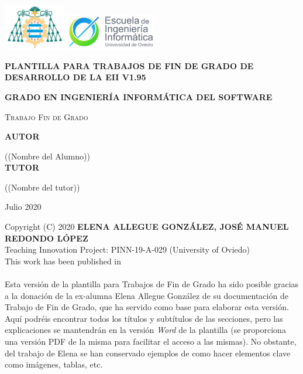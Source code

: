 \documentclass[11pt]{report}
\begin{document}

\hypersetup{pageanchor=false}
\begin{titlepage}
	\centering
	\includegraphics[width=0.2\textwidth]{EscudoUniovi}
	\hspace{3 cm}
	\includegraphics[width=0.3\textwidth]{EscudoEscuela}
	\par\vspace{1cm}
	
	\vspace{1.5cm}
	{\huge\bfseries PLANTILLA PARA TRABAJOS DE FIN DE GRADO DE DESARROLLO DE LA EII V1.95\par}
	\vspace{2cm}
	{\large \textbf{GRADO EN INGENIERÍA INFORMÁTICA DEL SOFTWARE} \par}
	\vspace{1cm}
	{\scshape\Large Trabajo Fin de Grado\par}
   	
  \vspace{2cm}
	\textbf{AUTOR}\par
	((Nombre del Alumno)) \\
	\vspace{1.5cm}
	\textbf{TUTOR}\par
	((Nombre del tutor))
	\vfill
	
	{\large Julio 2020 \par}
\end{titlepage}


\newpage
Copyright (C) 2020 \textbf{ELENA ALLEGUE GONZÁLEZ, JOSÉ MANUEL REDONDO LÓPEZ} \\
Teaching Innovation Project: PINN-19-A-029 (University of Oviedo)\\
This work has been published in \cite{RedondoPlantillasRG19} \cite{RedondoUCO20}\\
\\
Esta versión de la plantilla para Trabajos de Fin de Grado ha sido posible gracias a la donación de la ex-alumna Elena Allegue González de su documentación de Trabajo de Fin de Grado, que ha servido como base para elaborar esta versión. Aquí podréis encontrar todos los títulos y subtítulos de las secciones, pero las explicaciones se mantendrán en la versión \textit{Word} de la plantilla (se proporciona una versión PDF de la misma para facilitar el acceso a las mismas). No obstante, del trabajo de Elena se han conservado ejemplos de como hacer elementos clave como imágenes, tablas, etc.
\end{document}
